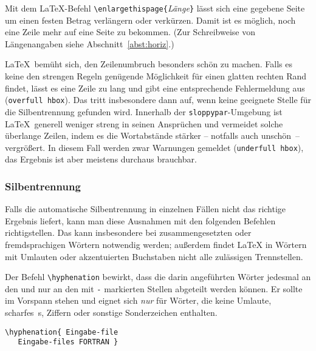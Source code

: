 Mit dem \LaTeX-Befehl \verb:\enlargethispage{:\textit{Länge}\verb:}:
lässt sich eine gegebene Seite um einen festen Betrag
verlängern oder verkürzen. Damit ist es möglich, noch
eine Zeile mehr auf eine Seite zu bekommen. 
(Zur Schreibweise von Längenangaben siehe Abschnitt~\ref{abst:horiz}.)
 
\LaTeX\ bemüht sich, den Zeilenumbruch besonders schön zu
machen.  Falls es keine den strengen Regeln genügende
Möglichkeit für einen glatten rechten Rand findet, lässt es
eine Zeile zu lang und gibt eine entsprechende Fehlermeldung 
aus (\texttt{over\-full hbox}).
Das tritt insbesondere dann auf, wenn keine geeignete Stelle
für die Silbentrennung gefunden wird.
Innerhalb der \texttt{sloppypar}-Umgebung ist \LaTeX\ generell
weniger streng in seinen Ansprüchen und vermeidet solche
überlange Zeilen, indem es die Wortabstände stärker --
notfalls auch unschön~-- vergrößert.
In diesem Fall werden zwar Warnungen gemeldet (\texttt{under\-full
hbox}), das Ergebnis ist aber meistens durchaus brauchbar.
 
 
\subsubsection{Silbentrennung} \label{silb}
 
Falls die automatische Silbentrennung in einzelnen Fällen nicht
das richtige Ergebnis liefert, kann man diese Ausnahmen mit den
folgenden Befehlen richtigstellen.
Das kann insbesondere bei zusammengesetzten oder fremdsprachigen
Wörtern notwendig werden; außerdem findet \LaTeX{} in Wörtern
mit Umlauten oder akzentuierten Buchstaben nicht alle zulässigen
Trennstellen.
 
Der Befehl \verb|\hyphenation| bewirkt, dass die darin
angeführten Wörter jedesmal an den und nur an den mit
\verb|-| markierten Stellen abgeteilt werden können.
Er sollte im Vorspann stehen und eignet sich
\emph{nur} für Wörter, die keine Umlaute, scharfes~s,
Ziffern oder sonstige Sonderzeichen enthalten.
\exa
~
\exb
\begin{verbatim}
\hyphenation{ Eingabe-file
   Eingabe-files FORTRAN }
\end{verbatim}
\exc
 

